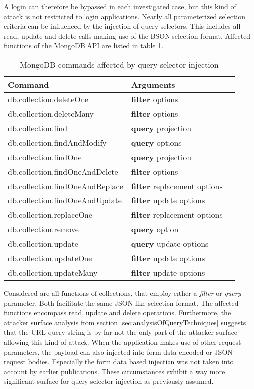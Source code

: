 A login can therefore be bypassed in each investigated case, but this kind of attack is not restricted to login applications. Nearly all parameterized selection criteria can be influenced by the injection of query selectors. This includes all read, update and delete calls making use of the BSON selection format. Affected functions of the MongoDB API \cite{MongoDB_CollFunc.2016} are listed in table \ref{tab:mongo_commands_affected}.\\

\begin{table}[h]
 \sffamily
 \centering
 \begin{tabular}{lll}
  \textbf{Command} & \textbf{Arguments} \\ \hline
  db.collection.deleteOne         & \textbf{filter} options \\
  db.collection.deleteMany        & \textbf{filter} options \\
  db.collection.find              & \textbf{query} projection \\
  db.collection.findAndModify     & \textbf{query} options \\
  db.collection.findOne           & \textbf{query} projection \\
  db.collection.findOneAndDelete  & \textbf{filter} options \\
  db.collection.findOneAndReplace & \textbf{filter} replacement options \\
  db.collection.findOneAndUpdate  & \textbf{filter} update options \\
  db.collection.replaceOne        & \textbf{filter} replacement options \\
  db.collection.remove            & \textbf{query} option \\
  db.collection.update            & \textbf{query} update options \\
  db.collection.updateOne         & \textbf{filter} update options \\
  db.collection.updateMany        & \textbf{filter} update options \\
  \bottomrule 
 \end{tabular}
 \caption{MongoDB commands affected by query selector injection}
 \label{tab:mongo_commands_affected}
\end{table}

Considered are all functions of collections, that employ either a \emph{filter} or \emph{query} parameter. Both facilitate the same JSON-like selection format. The affected functions encompass read, update and delete operations. Furthermore, the attacker surface analysis from section \ref{sec:analysisOfQueryTechniques} suggests that the URL query-string is by far not the only part of the attacker surface allowing this kind of attack. When the application makes use of other request parameters, the payload can also injected into form data encoded or JSON request bodies. Especially the form data based injection was not taken into account by earlier publications. These circumstances exhibit a way more significant surface for query selector injection as previously assumed. \\

